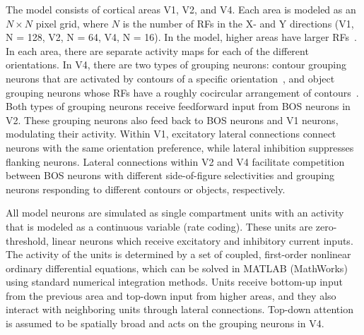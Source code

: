 \documentclass[11pt]{article}
\begin{document}
The model consists of cortical areas V1, V2, and V4. Each area is
modeled as an $N\times N$ pixel grid, where $N$ is the number of RFs
in the X- and Y directions (V1, N = 128, V2, N = 64, V4, N = 16).  In
the model, higher areas have larger RFs~\citep{Poort_etal12}. In each
area, there are separate activity maps for each of the different
orientations.  In V4, there are two types of grouping neurons: contour
grouping neurons that are activated by contours of a specific
orientation~\citep{Chen_etal14}, and object grouping neurons whose RFs
have a roughly cocircular arrangement of
contours~\citep{Mihalas_etal11b}. Both types of grouping neurons
receive feedforward input from BOS neurons in V2. These grouping
neurons also feed back to BOS neurons and V1 neurons, modulating their
activity. Within V1, excitatory lateral connections connect neurons
with the same orientation preference, while lateral inhibition
suppresses flanking neurons. Lateral connections within V2 and V4
facilitate competition between BOS neurons with different
side-of-figure selectivities and grouping neurons responding to
different contours or objects, respectively.

All model neurons are simulated as single compartment units with an
activity that is modeled as a continuous variable (rate coding). These
units are zero-threshold, linear neurons which receive excitatory and
inhibitory current inputs. The activity of the units is determined by
a set of coupled, first-order nonlinear ordinary differential
equations, which can be solved in MATLAB (MathWorks) using standard
numerical integration methods.  Units receive bottom-up input from the
previous area and top-down input from higher areas, and they also
interact with neighboring units through lateral connections. Top-down
attention is assumed to be spatially broad and acts on the grouping
neurons in V4.
\end{document}
